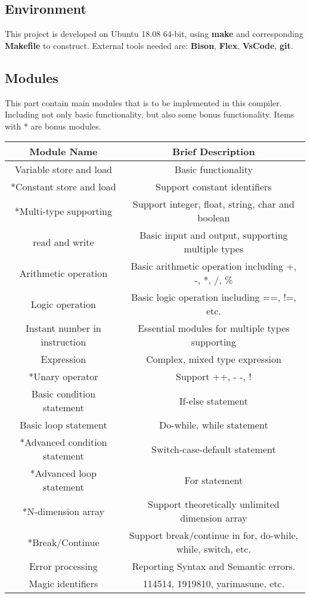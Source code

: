\documentclass{article}
\begin{document}
		\subsection{Environment}
		This project is developed on Ubuntu 18.08 64-bit, using \textbf{make} and corresponding \textbf{Makefile} to construct. External tools needed are: \textbf{Bison}, \textbf{Flex}, \textbf{VsCode}, \textbf{git}.
		\subsection{Modules}
		This part contain main modules that is to be implemented in this compiler. Including not only basic functionality, but also some bonus functionality. Items with * are bonus modules.
		\begin{center}
		\begin{tabular}{cc}
			\toprule
			Module Name & Brief Description\\
			\midrule
			Variable store and load & Basic functionality\\
			*Constant store and load & Support constant identifiers\\
			*Multi-type supporting & Support integer, float, string, char and boolean\\
			read and write & Basic input and output, supporting multiple types\\
			Arithmetic operation & Basic arithmetic operation including +, -, *, /, \%\\
			Logic operation & Basic logic operation including ==, !=, etc. \\
			Instant number in instruction & Essential modules for multiple types supporting\\
			Expression & Complex, mixed type expression\\
			*Unary operator & Support ++, - -, !\\
			Basic condition statement & If-else statement\\
			Basic loop statement & Do-while, while statement\\
			*Advanced condition statement & Switch-case-default statement\\
			*Advanced loop statement & For statement\\
			*N-dimension array & Support theoretically unlimited dimension array\\
			*Break/Continue & Support break/continue in for, do-while, while, switch, etc.\\
			Error processing & Reporting Syntax and Semantic errors.\\
			Magic identifiers & 114514, 1919810, yarimasune, etc.\\
			\bottomrule 
		\end{tabular}\\
		\end{center}
		
\end{document}
